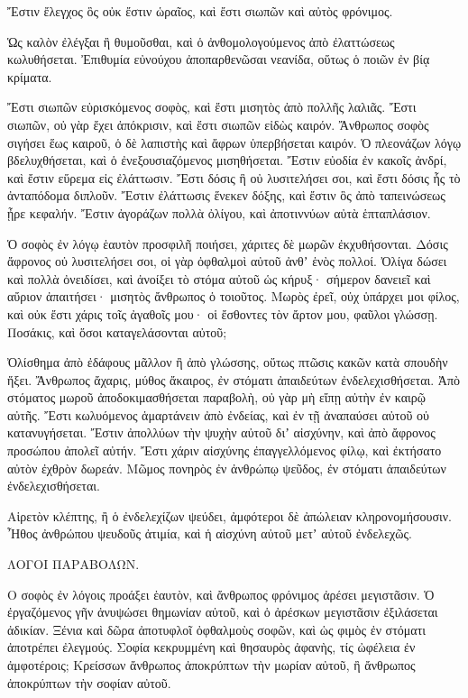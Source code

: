 {Ἔστιν ἔλεγχος ὃς οὐκ ἔστιν ὡραῖος, καὶ ἔστι σιωπῶν καὶ αὐτὸς φρόνιμος.
\par }{\PP {}Ὡς καλὸν ἐλέγξαι ἢ θυμοῦσθαι,
καὶ ὁ ἀνθομολογούμενος ἀπὸ ἐλαττώσεως κωλυθήσεται.
Ἐπιθυμία εὐνούχου ἀποπαρθενῶσαι νεανίδα, οὕτως ὁ ποιῶν ἐν βίᾳ κρίματα.
\par }{\PP {}Ἔστι σιωπῶν εὑρισκόμενος σοφὸς, καὶ ἔστι μισητὸς ἀπὸ πολλῆς λαλιᾶς.
Ἔστι σιωπῶν, οὐ γὰρ ἔχει ἀπόκρισιν, καὶ ἔστι σιωπῶν εἰδὼς καιρόν.
Ἄνθρωπος σοφὸς σιγήσει ἕως καιροῦ, ὁ δὲ λαπιστὴς καὶ ἄφρων ὑπερβήσεται καιρόν.
Ὁ πλεονάζων λόγῳ βδελυχθήσεται, καὶ ὁ ἐνεξουσιαζόμενος μισηθήσεται.
Ἔστιν εὐοδία ἐν κακοῖς ἀνδρί, καὶ ἔστιν εὕρεμα εἰς ἐλάττωσιν.
Ἔστι δόσις ἣ οὐ λυσιτελήσει σοι, καὶ ἔστι δόσις ἧς τὸ ἀνταπόδομα διπλοῦν.
Ἔστιν ἐλάττωσις ἕνεκεν δόξης, καὶ ἔστιν ὃς ἀπὸ ταπεινώσεως ᾖρε κεφαλήν.
Ἔστιν ἀγοράζων πολλὰ ὀλίγου, καὶ ἀποτιννύων αὐτὰ ἑπταπλάσιον.
\par }{\PP {}Ὁ σοφὸς ἐν λόγῳ ἑαυτὸν προσφιλῆ ποιήσει, χάριτες δὲ μωρῶν ἐκχυθήσονται.
Δόσις ἄφρονος οὐ λυσιτελήσει σοι, οἱ γὰρ ὀφθαλμοὶ αὐτοῦ ἀνθʼ ἑνὸς πολλοί.
Ὀλίγα δώσει καὶ πολλὰ ὀνειδίσει, καὶ ἀνοίξει τὸ στόμα αὐτοῦ ὡς κήρυξ· σήμερον δανειεῖ καὶ αὔριον ἀπαιτήσει· μισητὸς ἄνθρωπος ὁ τοιοῦτος.
Μωρὸς ἐρεῖ, οὐχ ὑπάρχει μοι φίλος, καὶ οὐκ ἔστι χάρις τοῖς ἀγαθοῖς μου· οἱ ἔσθοντες τὸν ἄρτον μου, φαῦλοι γλώσσῃ.
Ποσάκις, καὶ ὅσοι καταγελάσονται αὐτοῦ;
\par }{\PP {}Ὀλίσθημα ἀπὸ ἐδάφους μᾶλλον ἢ ἀπὸ γλώσσης, οὕτως πτῶσις κακῶν κατὰ σπουδὴν ἥξει.
Ἄνθρωπος ἄχαρις, μύθος ἄκαιρος, ἐν στόματι ἀπαιδεύτων ἐνδελεχισθήσεται.
Ἀπὸ στόματος μωροῦ ἀποδοκιμασθήσεται παραβολὴ, οὐ γὰρ μὴ εἴπῃ αὐτὴν ἐν καιρῷ αὐτῆς.
Ἔστι κωλυόμενος ἁμαρτάνειν ἀπὸ ἐνδείας, καὶ ἐν τῇ ἀναπαύσει αὐτοῦ οὐ κατανυγήσεται.
Ἔστιν ἀπολλύων τὴν ψυχὴν αὐτοῦ διʼ αἰσχύνην, καὶ ἀπὸ ἄφρονος προσώπου ἀπολεῖ αὐτήν.
Ἔστι χάριν αἰσχύνης ἐπαγγελλόμενος φίλῳ, καὶ ἐκτήσατο αὐτὸν ἐχθρὸν δωρεάν.
Μῶμος πονηρὸς ἐν ἀνθρώπῳ ψεῦδος, ἐν στόματι ἀπαιδεύτων ἐνδελεχισθήσεται.
\par }{\PP {}Αἱρετὸν κλέπτης, ἢ ὁ ἐνδελεχίζων ψεύδει, ἀμφότεροι δὲ ἀπώλειαν κληρονομήσουσιν.
Ἦθος ἀνθρώπου ψευδοῦς ἀτιμία, καὶ ἡ αἰσχύνη αὐτοῦ μετʼ αὐτοῦ ἐνδελεχῶς.
\par }{\PP ΛΟΓΟΙ ΠΑΡΑΒΟΛΩΝ.
\par }{\PP {}Ο σοφὸς ἐν λόγοις προάξει ἑαυτὸν, καὶ ἄνθρωπος φρόνιμος ἀρέσει μεγιστᾶσιν.
Ὁ ἐργαζόμενος γῆν ἀνυψώσει θημωνίαν αὐτοῦ, καὶ ὁ ἀρέσκων μεγιστᾶσιν ἐξιλάσεται ἀδικίαν.
Ξένια καὶ δῶρα ἀποτυφλοῖ ὀφθαλμοὺς σοφῶν, καὶ ὡς φιμὸς ἐν στόματι ἀποτρέπει ἐλεγμούς.
Σοφία κεκρυμμένη καὶ θησαυρὸς ἀφανὴς, τίς ὠφέλεια ἐν ἀμφοτέροις;
Κρείσσων ἄνθρωπος ἀποκρύπτων τὴν μωρίαν αὐτοῦ, ἢ ἄνθρωπος ἀποκρύπτων τὴν σοφίαν αὐτοῦ.

}

